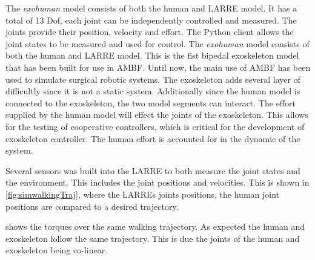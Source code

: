  
 The \textit{exohuman} model consists of both the human and LARRE model. It has a total of 13 Dof, each joint can be independently controlled and measured. The joints provide their position, velocity and effort. The Python client allows the joint states to be measured and used for control. The \textit{exohuman} model consists of both the human and LARRE model. This is the fist bipedal exoskeleton model that has been built for use in AMBF. Until now, the main use of AMBF has been used to simulate surgical robotic systems. The exoskeleton adds several layer of difficultly since it is not a static system. Additionally since the human model is connected to the exoskeleton, the two model segments can interact. The effort supplied by the human model will effect the joints of the exoskeleton. This allows for the testing of cooperative controllers, which is critical for the development of exoskeleton controller. The human effort is accounted for in the dynamic of the system.  
 
 
 Several sensors was built into the LARRE to both measure the joint states and the environment. This includes the joint positions and velocities. This is shown in \autoref{fig:simwalkingTraj}, where the LARREs joints positions, the human joint positions are compared to a desired trajectory.  \author{fig:simwalkingtorque} shows the torques over the same walking trajectory. As expected the human and exoskeleton follow the same trajectory. This is due the joints of the human and exoskeleton being co-linear.  
 
